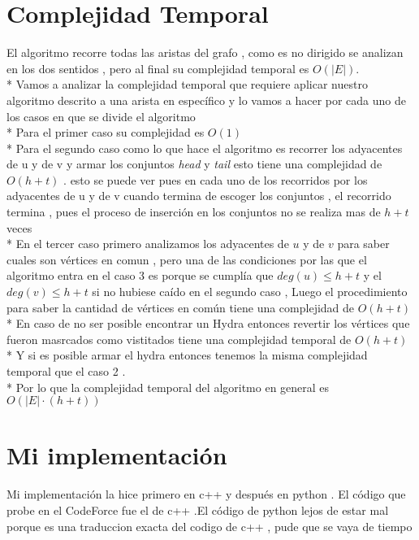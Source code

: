 \documentclass[12pt]{article}
\begin{document}
    \section{Complejidad Temporal }

    \noindent El algoritmo recorre todas las aristas del grafo , como es no dirigido se analizan en los dos sentidos ,  pero al final su complejidad temporal es $O \left(\vert E \vert\right)$.
    \\*
    Vamos a analizar la complejidad temporal que requiere aplicar nuestro algoritmo descrito a una arista en espec\'ifico y lo vamos a hacer por cada uno de los casos en que se divide el algoritmo
    \\*
    Para el primer caso su complejidad es $O\left(1\right)$
    \\*
    Para el segundo caso como lo que hace el algoritmo es recorrer los adyacentes de  u y de v y armar los conjuntos \textit{head} y \textit{tail} esto tiene una complejidad de  $O\left(h+t\right)$ . esto se puede ver pues en cada uno de los recorridos por los adyacentes 
    de u y de v cuando termina de escoger los conjuntos , el recorrido termina , pues el proceso de inserci\'on en los conjuntos no se realiza mas de $h+t$ veces
    \\*
    En el tercer caso primero analizamos los adyacentes de $u$ y de $v$ para saber cuales son v\'ertices en comun , pero una de las condiciones por las que el algoritmo entra en el caso 3 es porque se cumpl\'ia que $deg\left(u\right) \leq h+t$ y el $deg\left(v\right) \leq h+t$ si no hubiese ca\'ido en el segundo caso , 
    Luego el procedimiento para saber la cantidad de v\'ertices en  com\'un tiene una complejidad de $O\left(h+t\right)$  
    \\*
    En caso de no ser posible encontrar un Hydra entonces revertir los v\'ertices que fueron masrcados como vistitados tiene una complejidad temporal de $O\left(h+t\right)$
    \\*
    Y si es posible armar el hydra entonces tenemos la misma complejidad temporal que el caso 2 . 
    \\*
    Por lo que la complejidad temporal del algoritmo en general es $O\left(\vert E \vert \cdot \left(h+t\right)\right)$ 

    \section{Mi implementaci\'on}

    \noindent Mi implementaci\'on la hice primero en c++ y despu\'es en python  . El c\'odigo  que probe en el CodeForce fue el de c++ .El c\'odigo de python lejos de estar mal porque es una traduccion exacta del codigo de c++ , pude que se vaya de tiempo 
\end{document}

